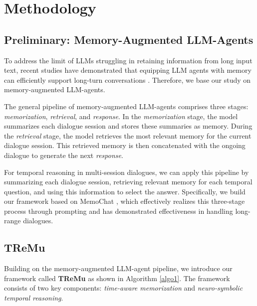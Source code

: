 





\section{Methodology}

\subsection{Preliminary: Memory-Augmented LLM-Agents}
To address the limit of LLMs struggling in retaining information from long input text, recent studies have demonstrated that equipping LLM agents with memory can efficiently support long-turn conversations \cite{lu2023memochat,packer2023memgpt,zhong2024memorybank}. Therefore, we base our study on memory-augmented LLM-agents.


The general pipeline of memory-augmented LLM-agents comprises three stages: \textit{memorization}, \textit{retrieval}, and \textit{response}. In the \textit{memorization} stage, the model summarizes each dialogue session and stores these summaries as memory. During the \textit{retrieval} stage, the model retrieves the most relevant memory for the current dialogue session. This retrieved memory is then concatenated with the ongoing dialogue to generate the next \textit{response}.

For temporal reasoning in multi-session dialogues, we can apply this pipeline by summarizing each dialogue session, retrieving relevant memory for each temporal question, and using this information to select the answer. Specifically, we build our framework based on MemoChat \cite{lu2023memochat}, which effectively realizes this three-stage process through prompting and has demonstrated effectiveness in handling long-range dialogues.

\subsection{TReMu}
Building on the memory-augmented LLM-agent pipeline, we introduce our framework called \textbf{TReMu} as shown in Algorithm \ref{algo1}. The framework consists of two key components: \textit{time-aware memorization} and \textit{neuro-symbolic temporal reasoning}.

